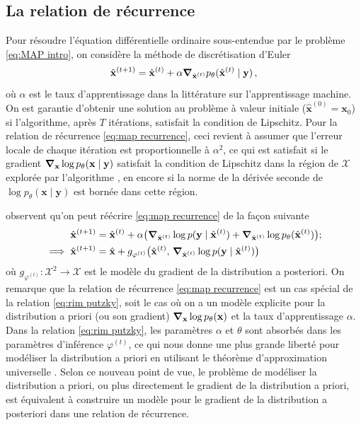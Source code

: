 \subsection{La relation de récurrence}
Pour résoudre l'équation différentielle ordinaire sous-entendue par le problème \eqref{eq:MAP intro}, 
on considère la méthode de discrétisation d'Euler 
\begin{equation}\label{eq:map recurrence}
        \hat{\mathbf{x}}^{(t+1)} = \hat{\mathbf{x}}^{(t)} + \alpha \grad_{\hat{\mathbf{x}}^{(t)}} p_\theta(\hat{\mathbf{x}}^{(t)} \mid \mathbf{y})\, ,
\end{equation} 
où $\alpha$ est le taux d'apprentissage dans la littérature sur 
l'apprentissage machine.
On est garantie d'obtenir une solution 
au problème à valeur initiale ($\hat{\mathbf{x}}^{(0)} = \mathbf{x}_0$) si l'algorithme, après $T$ itérations, 
satisfait la condition de Lipschitz. Pour la relation de récurrence \eqref{eq:map recurrence}, ceci revient 
à assumer que l'erreur locale de chaque itération est proportionnelle à $\alpha^{2}$, ce qui est 
satisfait si le gradient $\grad_{\mathbf{x}}\log p_\theta(\mathbf{x} \mid \mathbf{y})$ 
satisfait la condition de Lipschitz dans la région de $\mathcal{X}$ explorée par l'algorithme \citep{Atkinson1989,Butcher2016}, 
en encore si la norme de la dérivée seconde de $\log p_\theta(\mathbf{x} \mid \mathbf{y})$ est bornée dans cette région.

\citet{Putzky2017} observent qu'on peut réécrire \eqref{eq:map recurrence} de la façon suivante
\begin{align}
        \hat{\mathbf{x}}^{(t+1)} &= 
        \hat{\mathbf{x}}^{(t)} + \alpha \big( \grad_{\hat{\mathbf{x}}^{(t)}}\log p(\mathbf{y} \mid \hat{\mathbf{x}}^{(t)}) 
        +  \grad_{\hat{\mathbf{x}}^{(t)}}\log p_\theta(\hat{\mathbf{x}}^{(t)})\big);\\
        \label{eq:rim putzky}
        \implies \hat{\mathbf{x}}^{(t+1)} &= \hat{\mathbf{x}} + g_{\varphi^{(t)}}\big(\hat{\mathbf{x}}^{(t)},\, \grad_{\hat{\mathbf{x}}^{(t)}} \log p(\mathbf{y} \mid \hat{\mathbf{x}}^{(t)})\big)
\end{align}
où $g_{\varphi^{(t)}}: \mathcal{X}^{2} \rightarrow \mathcal{X}$ est le modèle du gradient de la distribution 
a posteriori. 
On remarque que la relation de récurrence \eqref{eq:map recurrence} est un cas spécial de la relation \eqref{eq:rim putzky}, 
soit le cas où on a un modèle explicite pour la distribution a priori (ou son gradient) $\grad_{\mathbf{x}} \log p_\theta(\mathbf{x})$ 
et la taux d'apprentissage $\alpha$. 
Dans la relation \eqref{eq:rim putzky}, les paramètres $\alpha$ et $\theta$ sont absorbés dans les paramètres d'inférence $\varphi^{(t)}$, ce qui nous donne 
une plus grande liberté pour modéliser la distribution a priori en utilisant le théorème d'approximation universelle \citep{Cybenko1989,Hornik1991}. 
Selon ce nouveau point de vue, 
le problème de modéliser la distribution a priori, ou plus directement le gradient de la distribution a priori, 
est équivalent à construire un modèle pour le gradient de la distribution a posteriori dans une relation 
de récurrence.

